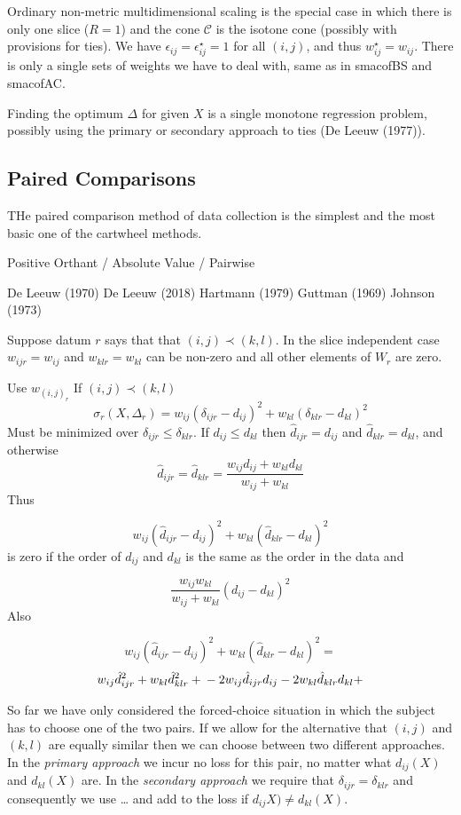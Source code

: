 \documentclass[
  12pt,
]{article}
\begin{document}
Ordinary non-metric multidimensional scaling is the special case in which
there is only one slice (\(R=1\)) and the cone \(\mathcal{C}\) is the isotone cone (possibly with provisions for ties). We have \(\epsilon_{ij}=\epsilon_{ij}^\star=1\) for all
\((i,j)\), and thus \(w_{ij}^\star=w_{ij}\). There is only a single sets of weights we have to deal with, same as in smacofBS and smacofAC.

Finding the optimum \(\Delta\) for given \(X\) is a single monotone regression
problem, possibly using the primary or secondary approach to ties (De Leeuw (1977)).

\subsection{Paired Comparisons}\label{paired-comparisons}

THe paired comparison method of data collection is the simplest and
the most basic one of the cartwheel methods.

Positive Orthant / Absolute Value / Pairwise

De Leeuw (1970)
De Leeuw (2018)
Hartmann (1979)
Guttman (1969)
Johnson (1973)

Suppose datum \(r\) says that that \((i,j)\prec(k,l)\). In the slice independent case \(w_{ijr}=w_{ij}\) and \(w_{klr}=w_{kl}\)
can be non-zero and all other elements of \(W_r\) are zero.

Use \(w_{(i,j)_r}\)
If \((i,j)\prec(k,l)\)
\[
\sigma_r(X,\Delta_r)=w_{ij}(\delta_{ijr}-d_{ij})^2+w_{kl}(\delta_{klr}-d_{kl})^2
\]
Must be minimized over \(\delta_{ijr}\leq\delta_{klr}\). If \(d_{ij}\leq d_{kl}\)
then \(\hat d_{ijr}=d_{ij}\) and \(\hat d_{klr}=d_{kl}\), and otherwise
\[
\hat d_{ijr}=\hat d_{klr}=\frac{w_{ij}d_{ij}+w_{kl}d_{kl}}{w_{ij}+w_{kl}}
\]
Thus

\[w_{ij}(\hat d_{ijr}-d_{ij})^2+w_{kl}(\hat d_{klr}-d_{kl})^2\]
is zero if the order of \(d_{ij}\) and \(d_{kl}\) is the same as the order in the data
and

\[
\frac{w_{ij}w_{kl}}{w_{ij}+w_{kl}}(d_{ij}-d_{kl})^2
\]
Also

\[w_{ij}(\hat d_{ijr}-d_{ij})^2+w_{kl}(\hat d_{klr}-d_{kl})^2=\]
\[
w_{ij}\hat d_{ijr}^2+w_{kl}\hat d_{klr}^2+\\
-2w_{ij}\hat d_{ijr}d_{ij}-2w_{kl}\hat d_{klr}d_{kl}+
\]

So far we have only considered the forced-choice situation in which
the subject has to choose one of the two pairs. If we allow for the alternative that \((i,j)\) and \((k,l)\) are equally similar then we can choose between two different approaches. In the \emph{primary approach} we incur no loss for this pair, no matter what \(d_{ij}(X)\) and \(d_{kl}(X)\) are. In the \emph{secondary approach} we require that \(\delta_{ijr}=\delta_{klr}\) and consequently we use \ldots{} and add to the loss if
\(d_{ij}X)\not= d_{kl}(X)\).
\end{document}
